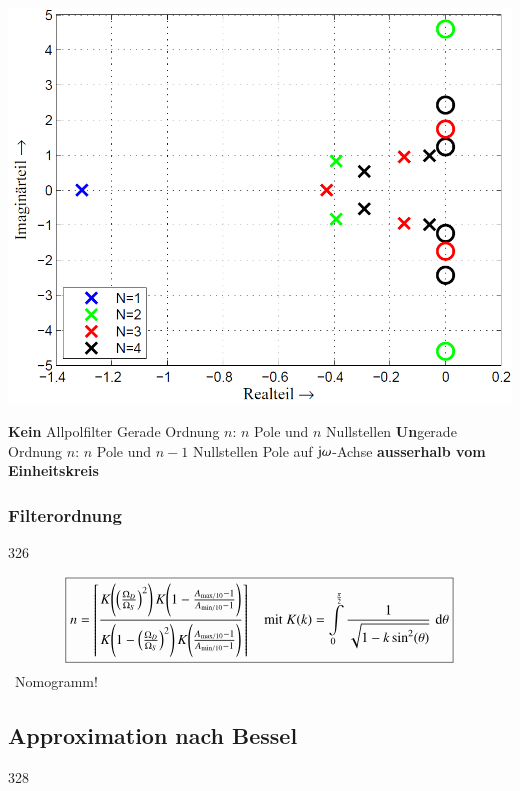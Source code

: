 \begin{minipage}[c]{0.4\columnwidth}
    \includegraphics[width=\columnwidth]{images/filter_cauer_pollage.png}
\end{minipage}
\hfill
\begin{minipage}[c]{0.58\columnwidth}
    \begin{outline}
        \1 \textbf{Kein} Allpolfilter
            \2 Gerade Ordnung $n$: $n$ Pole und $n$ Nullstellen
            \2 \textbf{Un}gerade Ordnung $n$: $n$ Pole und $n-1$ Nullstellen
        \1Pole auf $\mathrm{j} \omega$-Achse \textbf{ausserhalb vom Einheitskreis}
    \end{outline}
\end{minipage}


\subsubsection{Filterordnung}{326}

$$ \boxed{ n = \left\lceil \frac{ K \Bigg( \Big( \frac{\Omega_D}{\Omega_S} \Big)^2 \Bigg) \, K \Bigg( 1 - \frac{A_{\rm max / 10} - 1}{A_{\rm min / 10} - 1} \Bigg) }
    { K \Bigg( 1 -\Big( \frac{\Omega_D}{\Omega_S} \Big)^2 \Bigg) \, K \Bigg(\frac{A_{\rm max / 10} - 1}{A_{\rm min / 10} - 1} \Bigg) }  \right\rceil 
    \quad \text{mit } K(k) = \int\limits_{0}^{\frac{\pi}{2} }  \frac{1}{\sqrt{1- k \sin^2(\theta)}} \, \mathop{} \! \mathrm{d} \theta }$$
    \textrightarrow\ Nomogramm!


\subsection{Approximation nach Bessel}{328}

